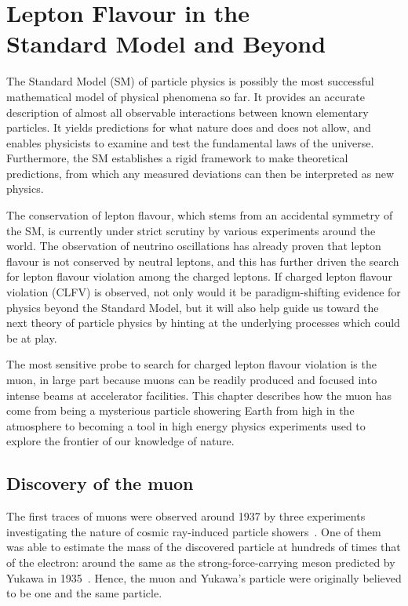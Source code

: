 \chapter[Lepton Flavour in the Standard Model and Beyond]{Lepton Flavour in
the\\Standard Model and Beyond}
\label{ch:theory}

\vspace{-.4cm}

The Standard Model (SM) of particle physics is possibly the most successful
mathematical model of physical phenomena so far. It provides an accurate
description of almost all observable interactions between known elementary
particles. It yields predictions for what nature does and does not allow, and
enables physicists to examine and test the fundamental laws of the universe.
Furthermore, the SM establishes a rigid framework to make theoretical
predictions, from which any measured deviations can then be interpreted as new
physics.

The conservation of lepton flavour, which stems from an accidental symmetry of
the SM, is currently under strict scrutiny by various experiments around the
world. The observation of neutrino oscillations has already proven that lepton
flavour is not conserved by neutral leptons, and this has further driven the
search for lepton flavour violation among the charged leptons. If charged lepton
flavour violation (CLFV) is observed, not only would it be paradigm-shifting
evidence for physics beyond the Standard Model, but it will also help guide us
toward the next theory of particle physics by hinting at the underlying
processes which could be at play.

The most sensitive probe to search for charged lepton flavour violation is the
muon, in large part because muons can be readily produced and focused into
intense beams at accelerator facilities. This chapter describes how the muon has
come from being a mysterious particle showering Earth from high in the
atmosphere to becoming a tool in high energy physics experiments used to explore
the frontier of our knowledge of nature.


\section{Discovery of the muon}
The first traces of muons were observed around 1937 by three experiments
investigating the nature of cosmic ray-induced particle
showers~\cite{PhysRev.51.884, PhysRev.52.1198, PhysRev.52.1003}. One of them was
able to estimate the mass of the discovered particle at hundreds of times that
of the electron: around the same as the strong-force-carrying meson predicted by
Yukawa in 1935~\cite{10.1143/PTPS.1.1}. Hence, the muon and Yukawa's particle
were originally believed to be one and the same particle. 


